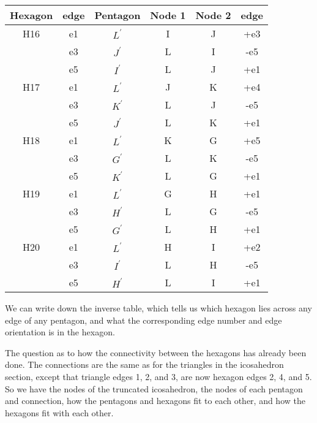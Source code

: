 \documentclass[12pt]{article}
\begin{document}
\begin{center}
\begin{tabular}{| c | c | c | c | c | c |}
\hline
Hexagon  & edge & Pentagon & Node 1 & Node 2 & edge \\
\hline
H16 &  e1  & $L^\prime$ &  I  & J &  +e3 \\
   &  e3  & $J^\prime$ &  L  & I &  -e5 \\
   &  e5  & $I^\prime$ &  L  & J &  +e1 \\
\hline
H17 &  e1  & $L^\prime$ &  J  & K &  +e4 \\
   &  e3  & $K^\prime$ &  L  & J &  -e5 \\
   &  e5  & $J^\prime$ &  L  & K &  +e1 \\
\hline
H18 &  e1  & $L^\prime$ &  K  & G &  +e5 \\
   &  e3  & $G^\prime$ &  L  & K &  -e5 \\
   &  e5  & $K^\prime$ &  L  & G &  +e1 \\
\hline
H19 &  e1  & $L^\prime$ &  G  & H &  +e1 \\
   &  e3  & $H^\prime$ &  L  & G &  -e5 \\
   &  e5  & $G^\prime$ &  L  & H &  +e1 \\
\hline
H20 &  e1  & $L^\prime$ &  H  & I &  +e2 \\
   &  e3  & $I^\prime$ &  L  & H &  -e5 \\
   &  e5  & $H^\prime$ &  L  & I &  +e1 \\
\hline
\end{tabular}
\end{center}

We can write down the inverse table, which tells us which hexagon lies
across any edge of any pentagon, and what the corresponding  edge number and edge
orientation is in the hexagon. 


The question as to how the connectivity between the hexagons has already
been done. The connections are the same as for the triangles in the icosahedron
 section, except that triangle edges 1, 2, and 3, are now hexagon edges 2, 4, and 5.
So we have the nodes of the truncated icosahedron, the nodes of each pentagon and
connection, how the pentagons and hexagons fit to each other, and how the hexagons
fit with each other.
\end{document}
